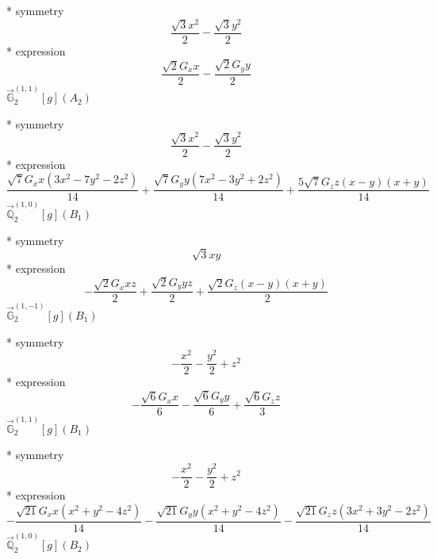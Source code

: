 \documentclass[fleqn,8pt]{jsarticle}
\begin{document}
\noindent\quad ** symmetry
\begin{dmath*}
\frac{\sqrt{3} x^{2}}{2} - \frac{\sqrt{3} y^{2}}{2}
\end{dmath*}
\noindent\quad ** expression
\begin{dmath*}
\frac{\sqrt{2} G_{x} x}{2} - \frac{\sqrt{2} G_{y} y}{2}
\end{dmath*}
\noindent\quad $\vec{\mathbb{G}}_{2}^{(1,1)}[g](A_{2})$

\noindent\quad ** symmetry
\begin{dmath*}
\frac{\sqrt{3} x^{2}}{2} - \frac{\sqrt{3} y^{2}}{2}
\end{dmath*}
\noindent\quad ** expression
\begin{dmath*}
\frac{\sqrt{7} G_{x} x \left(3 x^{2} - 7 y^{2} - 2 z^{2}\right)}{14} + \frac{\sqrt{7} G_{y} y \left(7 x^{2} - 3 y^{2} + 2 z^{2}\right)}{14} + \frac{5 \sqrt{7} G_{z} z \left(x - y\right) \left(x + y\right)}{14}
\end{dmath*}
\noindent\quad $\vec{\mathbb{Q}}_{2}^{(1,0)}[g](B_{1})$

\noindent\quad ** symmetry
\begin{dmath*}
\sqrt{3} x y
\end{dmath*}
\noindent\quad ** expression
\begin{dmath*}
- \frac{\sqrt{2} G_{x} x z}{2} + \frac{\sqrt{2} G_{y} y z}{2} + \frac{\sqrt{2} G_{z} \left(x - y\right) \left(x + y\right)}{2}
\end{dmath*}
\noindent\quad $\vec{\mathbb{G}}_{2}^{(1,-1)}[g](B_{1})$

\noindent\quad ** symmetry
\begin{dmath*}
- \frac{x^{2}}{2} - \frac{y^{2}}{2} + z^{2}
\end{dmath*}
\noindent\quad ** expression
\begin{dmath*}
- \frac{\sqrt{6} G_{x} x}{6} - \frac{\sqrt{6} G_{y} y}{6} + \frac{\sqrt{6} G_{z} z}{3}
\end{dmath*}
\noindent\quad $\vec{\mathbb{G}}_{2}^{(1,1)}[g](B_{1})$

\noindent\quad ** symmetry
\begin{dmath*}
- \frac{x^{2}}{2} - \frac{y^{2}}{2} + z^{2}
\end{dmath*}
\noindent\quad ** expression
\begin{dmath*}
- \frac{\sqrt{21} G_{x} x \left(x^{2} + y^{2} - 4 z^{2}\right)}{14} - \frac{\sqrt{21} G_{y} y \left(x^{2} + y^{2} - 4 z^{2}\right)}{14} - \frac{\sqrt{21} G_{z} z \left(3 x^{2} + 3 y^{2} - 2 z^{2}\right)}{14}
\end{dmath*}
\noindent\quad $\vec{\mathbb{Q}}_{2}^{(1,0)}[g](B_{2})$
\end{document}
